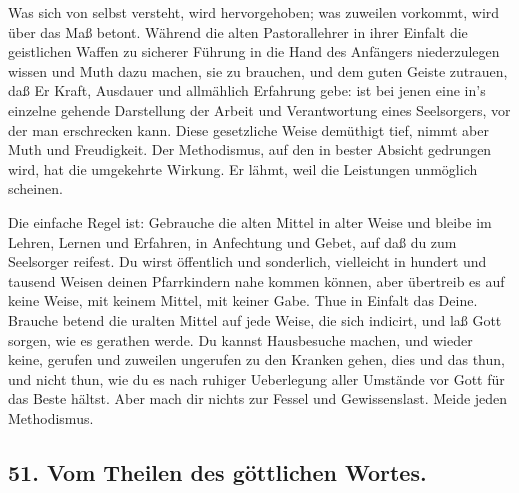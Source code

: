 Was sich von selbst versteht, wird hervorgehoben; was zuweilen vorkommt, wird über das Maß betont. Während die alten Pastorallehrer in ihrer Einfalt die geistlichen Waffen zu sicherer Führung in die Hand des Anfängers niederzulegen wissen und Muth dazu machen, sie zu brauchen, und dem guten Geiste zutrauen, daß Er Kraft, Ausdauer und allmählich Erfahrung gebe: ist bei jenen eine in’s einzelne gehende Darstellung der Arbeit und Verantwortung eines Seelsorgers, vor der man erschrecken kann. Diese gesetzliche Weise demüthigt tief, nimmt aber Muth und Freudigkeit. Der Methodismus, auf den in bester Absicht gedrungen wird, hat die umgekehrte Wirkung. Er lähmt, weil die Leistungen unmöglich scheinen.

Die einfache Regel ist: Gebrauche die alten Mittel in alter Weise und bleibe im Lehren, Lernen und Erfahren, in Anfechtung und Gebet, auf daß du zum Seelsorger reifest. Du wirst öffentlich und sonderlich, vielleicht in hundert und tausend Weisen deinen Pfarrkindern nahe kommen können, aber übertreib es auf keine Weise, mit keinem Mittel, mit keiner Gabe. Thue in Einfalt das Deine. Brauche betend die uralten Mittel auf jede Weise, die sich indicirt, und laß Gott sorgen, wie es gerathen werde. Du kannst Hausbesuche machen, und wieder keine, gerufen und zuweilen ungerufen zu den Kranken gehen, dies und das thun, und nicht thun, wie du es nach ruhiger Ueberlegung aller Umstände vor Gott für das Beste hältst. Aber mach dir nichts zur Fessel und Gewissenslast. Meide jeden Methodismus.

\subsection*{51. Vom Theilen des göttlichen Wortes.}


